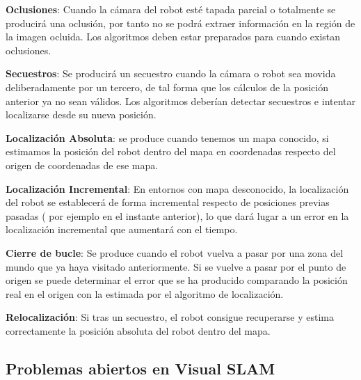 \textbf{Oclusiones}: Cuando la cámara del robot esté tapada parcial o totalmente se producirá una oclusión, por tanto no se podrá extraer información en la región de la imagen ocluida. Los algoritmos deben estar preparados para cuando existan oclusiones.

\textbf{Secuestros}: Se producirá un secuestro cuando la cámara o robot sea movida deliberadamente por un tercero, de tal forma que los cálculos de la posición anterior ya no sean válidos. Los algoritmos deberían detectar secuestros e intentar localizarse desde su nueva posición.

\textbf{Localización Absoluta}: se produce cuando tenemos un mapa conocido, si estimamos la posición del robot dentro del mapa en coordenadas respecto del origen de coordenadas de ese mapa.

\textbf{Localización Incremental}:  En entornos con mapa desconocido, la localización del robot se establecerá de forma incremental respecto de posiciones previas pasadas ( por ejemplo en el instante anterior), lo que dará lugar a un error en la localización incremental que aumentará con el tiempo.

\textbf{Cierre de bucle}: Se produce cuando el robot vuelva a pasar por una zona del mundo que ya haya visitado anteriormente. Si se vuelve a pasar por el punto de origen se puede determinar el error que se ha producido comparando la posición real en el origen con la estimada por el algoritmo de localización.

\textbf{Relocalización}: Si tras un secuestro, el robot consigue recuperarse y estima correctamente la posición absoluta del robot dentro del mapa.


\subsection{Problemas abiertos en Visual SLAM} \label{s:problemavlsam}

